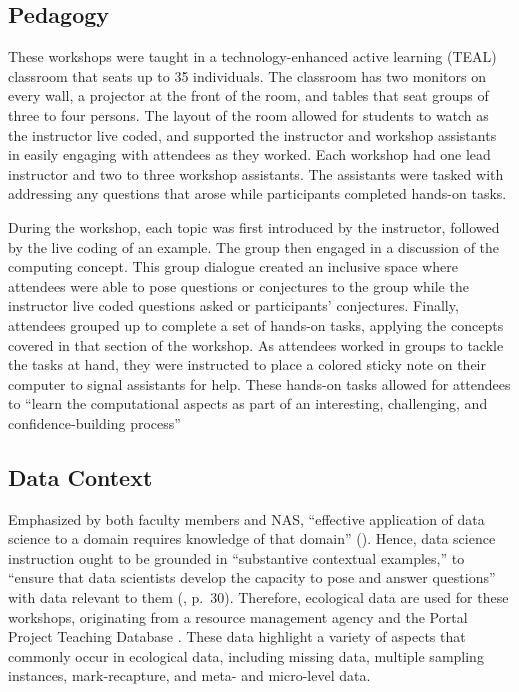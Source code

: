 \documentclass[12pt]{article}
\begin{document}

\subsection{Pedagogy}

\noindent These workshops were taught in a technology-enhanced active learning
(TEAL) classroom that seats up to 35 individuals. The classroom has two monitors
on every wall, a projector at the front of the room, and tables that seat groups
of three to four persons. The layout of the room allowed for students to
watch as the instructor live coded, and supported the instructor and workshop
assistants in easily engaging with attendees as they worked. Each workshop had
one lead instructor and two to three workshop assistants. The assistants were
tasked with addressing any questions that arose while participants completed 
hands-on tasks. 

During the workshop, each topic was first introduced by the instructor, 
followed by the live coding of an example. The group then engaged in a
discussion of the computing concept. This group dialogue created an inclusive
space where attendees were able to pose questions or conjectures to the group
while the instructor live coded questions asked or participants' conjectures.
Finally, attendees grouped up to complete a set of hands-on tasks, applying the
concepts covered in that section of the workshop. As
attendees worked in groups to tackle the tasks at hand, they were instructed to
place a colored sticky note on their computer to signal assistants for help.
These hands-on tasks allowed
for attendees to ``learn the computational aspects as part of an interesting,
challenging, and confidence-building process'' \citep[p.\ 101]{nolan}

\subsection{Data Context}  

\noindent Emphasized by both faculty members and NAS, ``effective
application of data science to a domain requires knowledge of that domain'' 
(\citeyear[p.\ 29]{nas}). Hence, data science instruction ought to be grounded
in ``substantive contextual examples,'' to ``ensure that data scientists develop
the capacity to pose and answer questions'' with data relevant to them
(\citeyear{nas}, p.\ 30). Therefore, ecological data are used for these
workshops, originating from a resource management agency and the
Portal Project Teaching Database \citep{portal_data}.  
These data highlight a variety of aspects that
commonly occur in ecological data, including missing data, multiple sampling instances,
mark-recapture, and meta- and micro-level data. 
\end{document}
